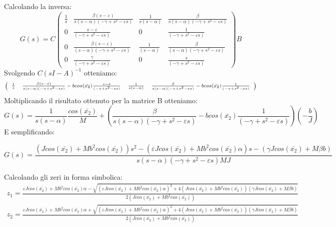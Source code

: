 Calcolando la inversa:
\begin{displaymath}
G(s)=C\left(\begin{array}{cccc}
\frac{1}{s} & \frac{\beta(s-\varepsilon)}{s(s-\alpha)(-\gamma+s^{2}-\varepsilon s)} & \frac{1}{s(s-\alpha)} & \frac{\beta}{s(s-\alpha)(-\gamma+s^{2}-\varepsilon s)}\\
0 & \frac{s-\varepsilon}{(-\gamma+s^{2}-\varepsilon s)} & 0 & \frac{1}{(-\gamma+s^{2}-\varepsilon s)}\\
0 & \frac{\beta(s-\varepsilon)}{(s-\alpha)(-\gamma+s^{2}-\varepsilon s)} & \frac{1}{(s-\alpha)} & \frac{\beta}{(s-\alpha)(-\gamma+s^{2}-\varepsilon s)}\\
0 & \frac{\gamma}{(-\gamma+s^{2}-\varepsilon s)} & 0 & \frac{s}{(-\gamma+s^{2}-\varepsilon s)}
\end{array}\right)B
\end{displaymath}
Svolgendo $C(sI-A)^{-1}$ otteniamo:
\begin{displaymath}
\begin{scriptsize}
\left(\begin{array}{cccc}
\frac{1}{s} & \frac{\beta(s-\varepsilon)}{s(s-\alpha)(-\gamma+s^{2}-\varepsilon s)}-bcos(\bar{x_{2}})\frac{s-\varepsilon}{(-\gamma+s^{2}-\varepsilon s)} & \frac{1}{s(s-\alpha)} & \frac{\beta}{s(s-\alpha)(-\gamma+s^{2}-\varepsilon s)}-bcos(\bar{x_{2}})\frac{1}{(-\gamma+s^{2}-\varepsilon s)}\end{array}\right)
\end{scriptsize}
\end{displaymath}
Moltiplicando il risultato ottenuto per la matrice B otteniamo:
\begin{displaymath}
G(s)=
\frac{1}{s(s-\alpha)}\frac{cos(\bar{x_{2}})}{M}+(\frac{\beta}{s(s-\alpha)(-\gamma+s^{2}-\varepsilon s)}-bcos(\bar{x_{2}})\frac{1}{(-\gamma+s^{2}-\varepsilon s)})(-\frac{b}{J})
\end{displaymath}
E semplificando:
\begin{scriptsize}
\begin{displaymath}
G(s)=\frac{(Jcos(\bar{x_{2}})+Mb^{2}cos(\bar{x_{2}}))s^{2}-(\varepsilon Jcos(\bar{x_{2}})+Mb^{2}cos(\bar{x_{2}})\alpha)s-(\gamma Jcos(\bar{x_{2}})+M\beta b)}{s(s-\alpha)(-\gamma+s^{2}-\varepsilon s)MJ}
\end{displaymath}
\end{scriptsize}
Calcolando gli zeri in forma simbolica:
\begin{displaymath}
\begin{array}{cc}
z_{1}=\frac{\varepsilon Jcos(\bar{x_{2}})+Mb^{2}cos(\bar{x_{2}})\alpha-\sqrt{(\varepsilon Jcos(\bar{x_{2}})+Mb^{2}cos(\bar{x_{2}})\alpha)^{2}+4(Jcos(\bar{x_{2}})+Mb^{2}cos(\bar{x_{2}}))(\gamma Jcos(\bar{x_{2}})+M\beta b)}}{2(Jcos(\bar{x_{2}})+Mb^{2}cos(\bar{x_{2}}))} \\
z_{2}=\frac{\varepsilon Jcos(\bar{x_{2}})+Mb^{2}cos(\bar{x_{2}})\alpha+\sqrt{(\varepsilon Jcos(\bar{x_{2}})+Mb^{2}cos(\bar{x_{2}})\alpha)^{2}+4(Jcos(\bar{x_{2}})+Mb^{2}cos(\bar{x_{2}}))(\gamma Jcos(\bar{x_{2}})+M\beta b)}}{2(Jcos(\bar{x_{2}})+Mb^{2}cos(\bar{x_{2}}))}
\end{array}
\end{displaymath}
